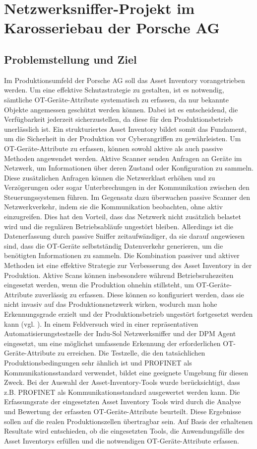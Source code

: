 \section{Netzwerksniffer-Projekt im Karosseriebau der Porsche AG}

\subsection{Problemstellung und Ziel}
Im Produktionsumfeld der Porsche AG soll das Asset Inventory vorangetrieben werden. Um eine effektive Schutzstrategie zu gestalten, ist es notwendig, sämtliche OT-Geräte-Attribute systematisch zu erfassen, da nur bekannte Objekte angemessen geschützt werden können. Dabei ist es entscheidend, die Verfügbarkeit jederzeit sicherzustellen, da diese für den Produktionsbetrieb unerlässlich ist. Ein strukturiertes Asset Inventory bildet somit das Fundament, um die Sicherheit in der Produktion vor Cyberangriffen zu gewährleisten. Um OT-Geräte-Attribute zu erfassen, können sowohl aktive als auch passive Methoden angewendet werden. Aktive Scanner senden Anfragen an Geräte im Netzwerk, um Informationen über deren Zustand oder Konfiguration zu sammeln. Diese zusätzlichen Anfragen können die Netzwerklast erhöhen und zu Verzögerungen oder sogar Unterbrechungen in der Kommunikation zwischen den Steuerungssystemen führen. Im Gegensatz dazu überwachen passive Scanner den Netzwerkverkehr, indem sie die Kommunikation beobachten, ohne aktiv einzugreifen. Dies hat den Vorteil, dass das Netzwerk nicht zusätzlich belastet wird und die regulären Betriebsabläufe ungestört bleiben. Allerdings ist die Datenerfassung durch passive Sniffer zeitaufwändiger, da sie darauf angewiesen sind, dass die OT-Geräte selbstständig Datenverkehr generieren, um die benötigten Informationen zu sammeln. Die Kombination passiver und aktiver Methoden ist eine effektive Strategie zur Verbesserung des Asset Inventory in der Produktion. Aktive Scans können insbesondere während Betriebsruhezeiten eingesetzt werden, wenn die Produktion ohnehin stillsteht, um OT-Geräte-Attribute zuverlässig zu erfassen. Diese können so konfiguriert werden, dass sie nicht invasiv auf das Produktionsnetzwerk wirken, wodurch man hohe Erkennungsgrade erzielt und der Produktionsbetrieb ungestört fortgesetzt werden kann (vgl. \cite{aktivScan}). In einem Feldversuch wird in einer repräsentativen Automatisierungstestzelle der Indu-Sol Netzwerksniffer und der DPM Agent eingesetzt, um eine möglichst umfassende Erkennung der erforderlichen OT-Geräte-Attribute zu erreichen. Die Testzelle, die den tatsächlichen Produktionsbedingungen sehr ähnlich ist und PROFINET als Kommunikationsstandard verwendet, bildet eine geeignete Umgebung für diesen Zweck. Bei der Auswahl der Asset-Inventory-Tools wurde berücksichtigt, dass z.B. PROFINET als Kommunikationsstandard ausgewertet  werden kann. Die Erfassungsrate der eingesetzten Asset Inventory Tools wird durch die Analyse und Bewertung der erfassten OT-Geräte-Attribute beurteilt. Diese Ergebnisse sollen auf die realen Produktionszellen übertragbar sein. Auf Basis der erhaltenen Resultate wird entschieden, ob die eingesetzten Tools, die Anwendungsfälle des Asset Inventorys erfüllen und die notwendigen OT-Geräte-Attribute erfassen. 